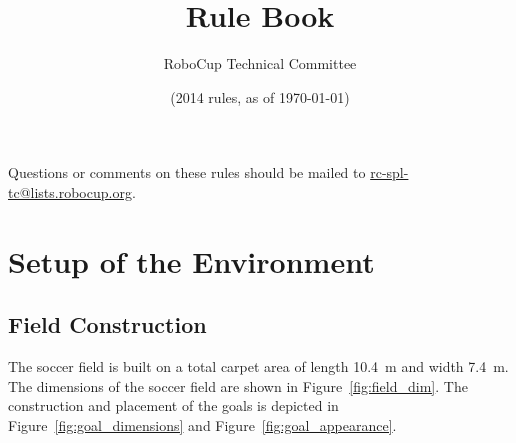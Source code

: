 \documentclass[12pt]{article}
\title{\leaguename Rule Book}
\author{RoboCup Technical Committee}
\date{(2014 rules, as of \today)}
\newcommand{\TotalWidth}{7.4~m\xspace}
\newcommand{\TotalLength}{10.4~m\xspace }
\begin{document}
\maketitle

\begin{center}
Questions or comments on these rules should be mailed to \url{rc-spl-tc@lists.robocup.org}.
\end{center}

\vfill

\tableofcontents
\setcounter{tocdepth}{3}

\thispagestyle{fancy}

\clearpage

\cfoot{\thepage}
\setcounter{page}{1}

\section{Setup of the Environment}

\subsection{Field Construction}
\label{sec:field_dim}

The soccer field is built on a total carpet area of length \TotalLength and width \TotalWidth. The dimensions of the soccer field are shown in Figure~\ref{fig:field_dim}. The construction and placement of the goals is depicted in Figure~\ref{fig:goal_dimensions} and Figure~\ref{fig:goal_appearance}.
\end{document}
